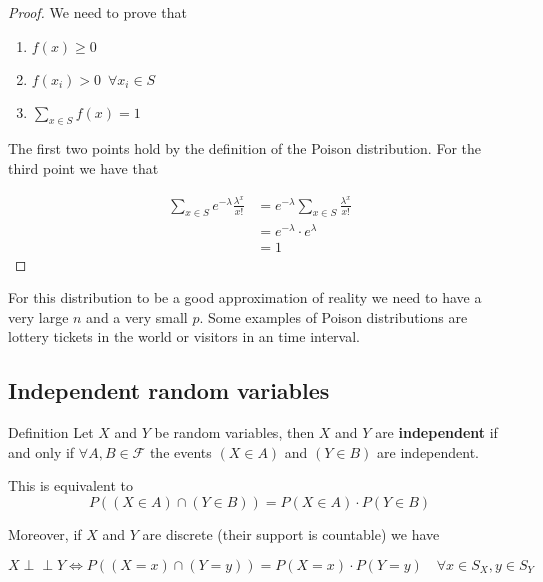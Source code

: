 \documentclass[10pt]{extarticle}
\newcommand{\F}{\mathcal{F}}
\newcommand{\indep}{\perp \!\!\! \perp}
\begin{document}
\begin{proof}
    We need to prove that
    \begin{enumerate}
        \item $f(x) \geq 0$
        \item $f(x_i) > 0 \enspace \forall x_i \in S$
        \item $\sum_{x \in S} f(x) = 1$
    \end{enumerate}

    The first two points hold by the definition of the Poison distribution. For the third point we have that

    \begin{align*}
        \sum_{x \in S} e^{-\lambda} \frac{\lambda^x}{x!} & = e^{-\lambda} \sum_{x \in S} \frac{\lambda^x}{x!} \\
                                                         & = e^{-\lambda} \cdot e^\lambda                     \\
                                                         & = 1
    \end{align*}
\end{proof}

For this distribution to be a good approximation of reality we need to have a very large $n$ and a very small $p$. Some examples of Poison distributions are lottery tickets in the world or visitors in an time interval.

\subsection{Independent random variables}

\begin{bluebox}{Definition}
    Let $X$ and $Y$ be random variables, then $X$ and $Y$ are \textbf{independent} if and only if $\forall A, B \in \F$ the events $(X \in A)$ and $(Y \in B)$ are independent.

    This is equivalent to
    $$
        P((X \in A) \cap (Y \in B)) = P(X \in A) \cdot P(Y \in B)
    $$
\end{bluebox}

Moreover, if $X$ and $Y$ are discrete (their support is countable) we have

$$
    X \indep Y \iff P((X = x) \cap (Y = y)) = P(X = x) \cdot P(Y = y) \quad \forall x \in S_X, y \in S_Y
$$
\end{document}
